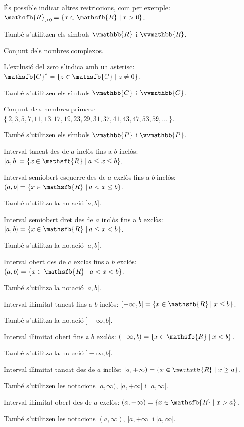 \begin{list}{}
	 És possible indicar altres restriccions, com per exemple:  $\mathsfb{R}_{> 0} = \{ x \in \mathsfb{R} \mid x > 0 \}$. 
	 
	 També s'utilitzen els símbols $\vmathbb{R}$ i $\vvmathbb{R}$.
	 
	\item[$\mathsfb{C}$] Conjunt dels nombres complexos.  
	
	L'exclusió del zero s'indica amb un asterisc: $\mathsfb{C}^* = \{ z \in \mathsfb{C} \mid z \ne 0 \}$.
	
	 També s'utilitzen els símbols $\vmathbb{C}$ i $\vvmathbb{C}$.
	 
	 \item[$\mathsfb{P}$] Conjunt dels nombres primers: $\{\,2,3,5,7,11,13,17,19,23,29,31,37,41,43,47,53,59,\ldots\,\}$.
	 
	 També s'utilitzen els símbols $\vmathbb{P}$ i $\vvmathbb{P}$.
	 
	 \item[{$[a,b]$}] Interval tancat des de $a$ inclòs fins a $b$ inclòs: $[a,b] = \{x \in \mathsfb{R} \mid a \leq x \leq b\}$.
	 
	 \item[{$(a,b]$}] Interval semiobert esquerre des de $a$ exclòs fins a $b$ inclòs: $(a,b] = \{x \in \mathsfb{R} \mid a < x \leq b\}$. 
	 
	 També s'utilitza la notació $]a,b]$.
	 
	 \item[{$[a,b)$}] Interval semiobert dret des de $a$ inclòs fins a $b$ exclòs: $[a,b) = \{x \in \mathsfb{R} \mid a \leq x < b\}$. 
	 
	 També s'utilitza la notació $[a,b[$.
	 
	 \item[{$(a,b)$}] Interval obert des de $a$ exclòs fins a $b$ exclòs: $(a,b) = \{x \in \mathsfb{R} \mid a < x < b\}$. 
	 
	 També s'utilitza la notació $]a,b[$.
	 
	 \item[{$(-\infty,b]$}] Interval iŀlimitat tancat fins a $b$ inclòs: $(-\infty,b] = \{x \in \mathsfb{R} \mid x \leq b\}$.  
	 
	 També s'utilitza la notació $]-\infty,b]$.
	 
	 \item[{$(-\infty,b)$}] Interval iŀlimitat obert fins a $b$ exclòs: $(-\infty,b) = \{x \in \mathsfb{R} \mid x < b\}$. 
	 
	 També s'utilitza la notació $]-\infty,b[$.
	 
	 \item[{$[a,+\infty)$}] Interval iŀlimitat tancat des de $a$ inclòs: $[a, +\infty) = \{x \in \mathsfb{R} \mid  x \geq a\}$. 
	 
	 També s'utilitzen les notacions $[a, \infty)$, $[a, +\infty[$ i $[a, \infty[$.

	\item[{$(a,+\infty)$}] Interval iŀlimitat obert des de $a$ exclòs: $(a, +\infty) = \{x \in \mathsfb{R} \mid  x > a\}$. 
	
	També s'utilitzen les notacions $(a, \infty)$, $]a, +\infty[$ i $]a, \infty[$.
\end{list}
